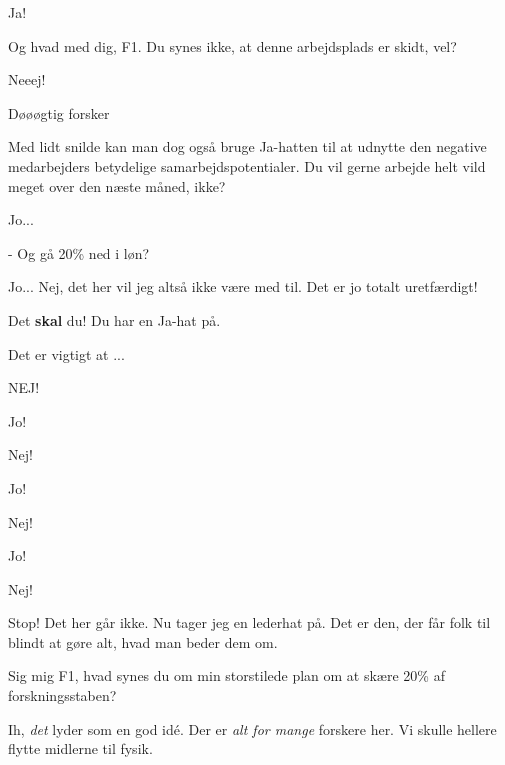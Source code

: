 \documentclass[a4paper,11pt]{article}
\begin{document}
\begin{sketch}
 Ja!

  Og hvad med dig, F1. Du synes ikke, at
denne arbejdsplads er skidt, vel?

 Neeej! 

 Døøøgtig forsker 

Med lidt snilde kan man dog også bruge Ja-hatten til at udnytte den negative medarbejders betydelige samarbejdspotentialer.  Du vil gerne arbejde helt vild meget over den næste måned, ikke?

 Jo...  

 - Og gå 20\% ned i løn?  

  Jo...  Nej, det her vil jeg altså ikke være med til. Det er jo totalt
uretfærdigt!

 Det \textbf{skal} du! Du har en Ja-hat på.



  Det er vigtigt at ...

  NEJ!

 Jo!

  Nej!

 Jo!  

 Nej!

 Jo!

 Nej!

 Stop! Det her går ikke. Nu tager jeg en lederhat på.  Det er den, der
får folk til blindt at gøre alt, hvad man beder dem om.


 Sig mig F1, hvad synes du om min storstilede plan om at
skære 20\% af forskningsstaben?

 Ih, \emph{det} lyder som en god idé. Der er \textit{alt for mange}
forskere her. Vi skulle hellere flytte midlerne til fysik.


\end{sketch}
\end{document}
